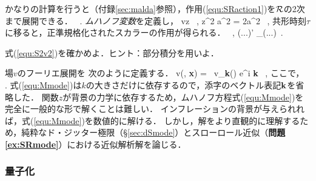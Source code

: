 かなりの計算を行うと（付録\ref{sec:malda}参照），作用(\ref{equ:SRaction1})を${\cal R}$の2次まで展開できる．
\beq
\label{equ:S(2)}
 \, .%
\eeq
{\it ムハノフ変数}を定義し，
\beq
v\equiv z \R \, , \qquad {} \qquad z^2 \equiv a^2 = 2a^2 \varepsilon\, ,
\eeq
共形時刻$\tau$に移ると，正準規格化されたスカラーの作用が得られる．
\beq
\label{equ:S2v2}
\, , \qquad (...)' \equiv \partial_\tau(...)\, .
\eeq
\begin{thm}[ムハノフ作用]
式(\ref{equ:S2v2})を確かめよ．ヒント：部分積分を用いよ．
 \end{thm}
場$v$のフーリエ展開を
次のように定義する．
\beq
v(\tau, {\bf x}) = \int {} \, v_{\bf k}(\tau) e^{i {\bf k} }\, ,
\eeq
ここで，
\beq
\label{equ:Mmode}
\, .
\eeq
式(\ref{equ:Mmode})は$k$の大きさだけに依存するので，添字のベクトル表記${\bf k}$を省略した．
関数$z$が背景の力学に依存するため，ムハノフ方程式(\ref{equ:Mmode})を完全に一般的な形で解くことは難しい．
インフレーションの背景が与えられれば，式(\ref{equ:Mmode})を数値的に解ける．
しかし，解をより直観的に理解するため，純粋なド・ジッター極限（\S\ref{sec:dSmode}）とスローロール近似（{\bf 問題\ref{ex:SRmode}}）における近似解析解を論じる．




\subsubsection{量子化}

